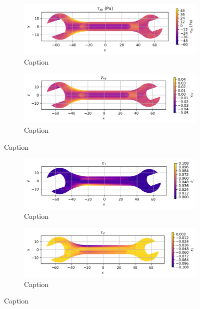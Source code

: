 \begin{figure}[H]
  \centering
  \begin{subfigure}[t]{0.49\textwidth}
    \centering
    \includegraphics[width=\textwidth]{GRAFICOS/Case c - tau_xy.png}
    \caption{Caption}
    \label{fig:deformada_reacciones}
  \end{subfigure}
  \hfill
  \begin{subfigure}[t]{0.49\textwidth}
    \centering
    \includegraphics[width=\textwidth]{GRAFICOS/Case c - gamma_xy.png}
    \caption{Caption}
    \label{fig:von_mises}
  \end{subfigure}
  \caption{Caption}
  \label{fig:analisis_estructural}
\end{figure}

\begin{figure}[H]
  \centering
  \begin{subfigure}[t]{0.49\textwidth}
    \centering
    \includegraphics[width=\textwidth]{GRAFICOS/Case c - epsilon_1.png}
    \caption{Caption}
    \label{fig:deformada_reacciones}
  \end{subfigure}
  \hfill
  \begin{subfigure}[t]{0.49\textwidth}
    \centering
    \includegraphics[width=\textwidth]{GRAFICOS/Case c - epsilon_2.png}
    \caption{Caption}
    \label{fig:von_mises}
  \end{subfigure}
  \caption{Caption}
  \label{fig:analisis_estructural}
\end{figure}


